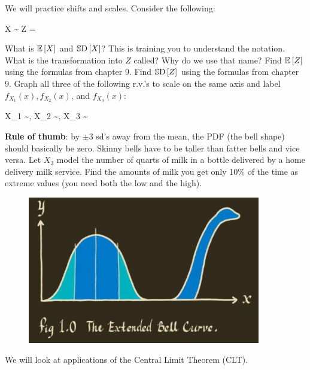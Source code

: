 \documentclass[12pt]{article}
\begin{document}
\problem We will practice shifts and scales. Consider the following:

\beqn
X \sim \normnot{\mu}{\sigsq} \quad {} \quad Z = 
\eeqn

\benum
\easysubproblem What is $\mathbb{E}\left[X\right]$ and $\mathbb{S}\text{D}\left[X\right]$? This is training you to understand the notation.
\easysubproblem What is the transformation into $Z$ called? Why do we use that name?
\easysubproblem Find $\mathbb{E}\left[Z\right]$ using the formulas from chapter 9.
\easysubproblem Find $\mathbb{S}\text{D}\left[Z\right]$ using the formulas from chapter 9.
\hardsubproblem Graph all three of the following r.v.'s to scale on the same axis and label $f_{X_1}(x), f_{X_2}(x)$, and $f_{X_3}(x)$:

\beqn
X_1 \sim {}, \quad X_2 \sim {}, \quad X_3 \sim {}
\eeqn


\textbf{Rule of thumb}: by $\pm 3$ sd's away from the mean, the PDF (the bell shape) should basically be zero. Skinny bells have to be taller than fatter bells and vice versa.
\intermediatesubproblem Let $X_3$ model the number of quarts of milk in a bottle delivered by a home delivery milk service. Find the amounts of milk you get only 10\% of the time as extreme values (you need both the low and the high).
\eenum



\begin{figure}[htp]
\centering
\includegraphics[width=4in, height=2.53in]{bellcurve.jpg}
\end{figure}
\FloatBarrier

\problem We will look at applications of the Central Limit Theorem (CLT).
\end{document}
